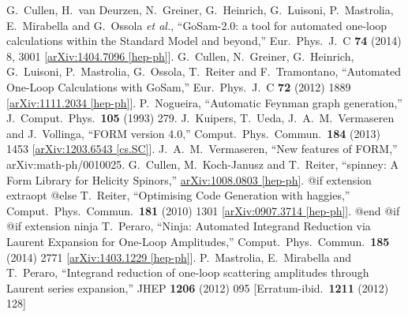 {{{{{{{{{\begin{thebibliography}{ABC}
  G.~Cullen, H.~van Deurzen, N.~Greiner, G.~Heinrich, G.~Luisoni, P.~Mastrolia, E.~Mirabella and G.~Ossola {\it et al.},
  ``GoSam-2.0: a tool for automated one-loop calculations within the Standard Model and beyond,''
  Eur.\ Phys.\ J.\ C {\bf 74} (2014) 8,  3001
  [\href{http://arxiv.org/abs/1404.7096}{arXiv:1404.7096 [hep-ph]}].
  G.~Cullen, N.~Greiner, G.~Heinrich, G.~Luisoni, P.~Mastrolia, G.~Ossola, T.~Reiter and F.~Tramontano,
  ``Automated One-Loop Calculations with GoSam,''
  Eur.\ Phys.\ J.\ C {\bf 72} (2012) 1889
  [\href{http://arxiv.org/abs/1111.2034}{arXiv:1111.2034 [hep-ph]}].
  P.~Nogueira,
  ``Automatic Feynman graph generation,''
  J.\ Comput.\ Phys.\  {\bf 105} (1993) 279.
  J.~Kuipers, T.~Ueda, J.~A.~M.~Vermaseren and J.~Vollinga,
  ``FORM version 4.0,''
  Comput.\ Phys.\ Commun.\  {\bf 184} (2013) 1453
  [\href{http://arxiv.org/abs/1203.6543}{arXiv:1203.6543 [cs.SC]}].
  J.~A.~M.~Vermaseren,
  ``New features of FORM,''
  arXiv:math-ph/0010025.
  G.~Cullen, M.~Koch-Janusz and T.~Reiter,
  ``spinney: A Form Library for Helicity Spinors,''
  \href{http://arxiv.org/abs/1008.0803}{arXiv:1008.0803 [hep-ph]}.
@if extension extraopt %
@else%
  T.~Reiter,
  ``Optimising Code Generation with haggies,''
  Comput.\ Phys.\ Commun.\  {\bf 181} (2010) 1301
  [\href{http://arxiv.org/abs/0907.3714}{arXiv:0907.3714 [hep-ph]}].
@end @if %
@if extension ninja %
  T.~Peraro,
  ``Ninja: Automated Integrand Reduction via Laurent Expansion for One-Loop Amplitudes,''
  Comput.\ Phys.\ Commun.\  {\bf 185} (2014) 2771
  [\href{http://arxiv.org/abs/1403.1229}{arXiv:1403.1229 [hep-ph]}].
  P.~Mastrolia, E.~Mirabella and T.~Peraro,
  ``Integrand reduction of one-loop scattering amplitudes through Laurent series expansion,''
  JHEP {\bf 1206} (2012) 095
   [Erratum-ibid.\  {\bf 1211} (2012) 128]

\end{thebibliography}}}}}}}}}}
